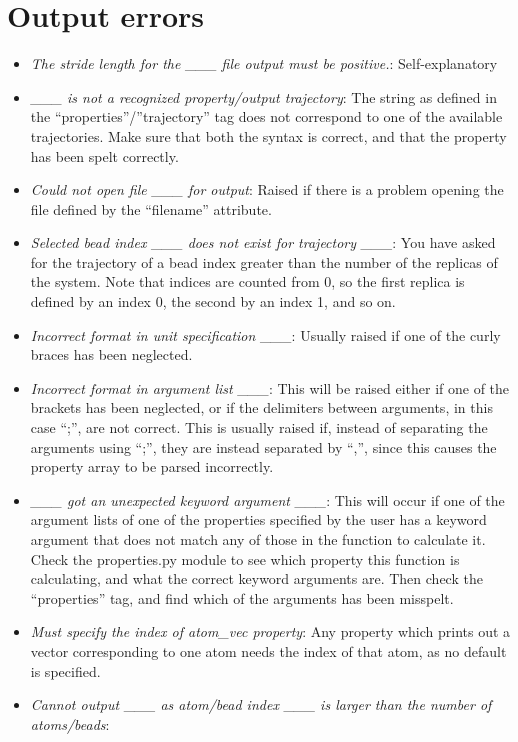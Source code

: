 \documentclass[11pt,english,fleqn]{report}
\begin{document}
\section{Output errors}
\begin{itemize}
\item \emph{The stride length for the \_\_\_ file output must be positive.}:
Self-explanatory
\item \emph{\_\_\_ is not a recognized property/output trajectory}: The
string as defined in the {}``properties''/''trajectory'' tag does
not correspond to one of the available trajectories. Make sure that
both the syntax is correct, and that the property has been spelt correctly.
\item \emph{Could not open file \_\_\_ for output}: Raised if there is
a problem opening the file defined by the {}``filename'' attribute.
\item \emph{Selected bead index \_\_\_ does not exist for trajectory \_\_\_}:
You have asked for the trajectory of a bead index greater than the
number of the replicas of the system. Note that indices are counted
from 0, so the first replica is defined by an index 0, the second
by an index 1, and so on.
\item \emph{Incorrect format in unit specification \_\_\_}: Usually raised
if one of the curly braces has been neglected.
\item \emph{Incorrect format in argument list \_\_\_}: This will be raised
either if one of the brackets has been neglected, or if the delimiters
between arguments, in this case {}``;'', are not correct. This is
usually raised if, instead of separating the arguments using {}``;'',
they are instead separated by {}``,'', since this causes the property
array to be parsed incorrectly.
\item \emph{\_\_\_ got an unexpected keyword argument \_\_\_}: This will
occur if one of the argument lists of one of the properties specified
by the user has a keyword argument that does not match any of those
in the function to calculate it. Check the properties.py module to
see which property this function is calculating, and what the correct
keyword arguments are. Then check the {}``properties'' tag, and
find which of the arguments has been misspelt.
\item \emph{Must specify the index of atom\_vec property}: Any property
which prints out a vector corresponding to one atom needs the index
of that atom, as no default is specified.
\item \emph{Cannot output \_\_\_ as atom/bead index \_\_\_ is larger than the number of atoms/beads}:

\end{itemize}
\end{document}
